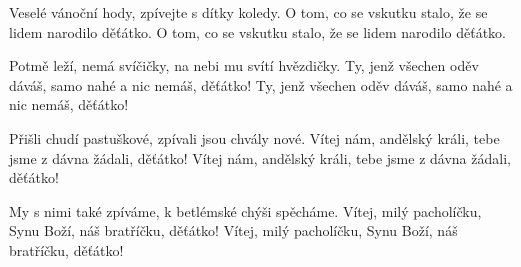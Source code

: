 \vskip-5mm
\IncludeLilypond

Veselé vánoční hody, zpívejte s dítky koledy.
O tom, co se vskutku stalo, že se lidem narodilo děťátko.
O tom, co se vskutku stalo, že se lidem narodilo děťátko.

Potmě leží, nemá svíčičky, na nebi mu svítí hvězdičky.
Ty, jenž všechen oděv dáváš, samo nahé a nic nemáš, děťátko!
Ty, jenž všechen oděv dáváš, samo nahé a nic nemáš, děťátko!

Přišli chudí pastuškové, zpívali jsou chvály nové.
Vítej nám, andělský králi, tebe jsme z dávna žádali, děťátko!
Vítej nám, andělský králi, tebe jsme z dávna žádali, děťátko!

My s nimi také zpíváme, k betlémské chýši spěcháme.
Vítej, milý pacholíčku, Synu Boží, náš bratříčku, děťátko!
Vítej, milý pacholíčku, Synu Boží, náš bratříčku, děťátko!
